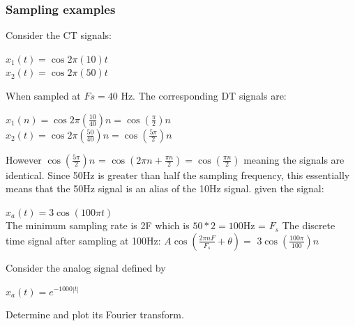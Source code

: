 \documentclass{article}
\begin{document}
\subsubsection{Sampling examples}
Consider the CT signals: 
\begin{center}
$x_1(t) = \cos2\pi(10)t$ \\
\vspace{1em}
$x_2(t) = \cos2\pi(50)t$
\end{center}
When sampled at $Fs = 40$ Hz. The corresponding DT signals are:
\begin{center}
$x_1(n) = \cos2\pi(\frac{10}{40})n  = \cos(\frac{\pi}{2})n$ \\
\vspace{1em}
$x_2(t) = \cos2\pi(\frac{50}{40})n = \cos(\frac{5\pi}{2})n$
\end{center}
However $\cos(\frac{5\pi}{2})n$ = $\cos(2\pi n + \frac{\pi n}{2})=  \cos( \frac{\pi n}{2})$ meaning the signals are identical. Since 50Hz is greater than half the sampling frequency, this essentially means that the 50Hz signal is an alias of the 10Hz signal.
\vspace{1em}
given the signal:
\begin{center}
$x_a(t) = 3\cos(100\pi t)$ \\
\vspace{1em}
The minimum sampling rate is 2F which is $50*2 = 100$Hz = $F_s$
\vspace{1em}
The discrete time signal after sampling at 100Hz: $A\cos(\frac{2\pi nF}{F_s}+ \theta) =$ $3\cos(\frac{100\pi}{100})n$
\end{center}
Consider the analog signal defined by 
\begin{center}
$x_a(t) = e^{-1000|t|}$
\end{center}
Determine and plot its Fourier transform. \\
\end{document}
